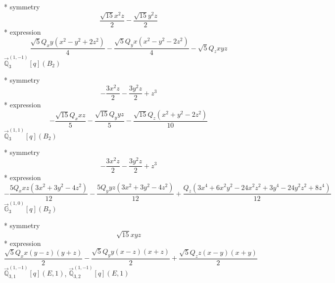 \documentclass[fleqn,8pt]{jsarticle}
\begin{document}
\noindent\quad ** symmetry
\begin{dmath*}
\frac{\sqrt{15} x^{2} z}{2} - \frac{\sqrt{15} y^{2} z}{2}
\end{dmath*}
\noindent\quad ** expression
\begin{dmath*}
\frac{\sqrt{5} Q_{x} y \left(x^{2} - y^{2} + 2 z^{2}\right)}{4} - \frac{\sqrt{5} Q_{y} x \left(x^{2} - y^{2} - 2 z^{2}\right)}{4} - \sqrt{5} Q_{z} x y z
\end{dmath*}
\noindent\quad $\vec{\mathbb{Q}}_{3}^{(1,-1)}[q](B_{2})$

\noindent\quad ** symmetry
\begin{dmath*}
- \frac{3 x^{2} z}{2} - \frac{3 y^{2} z}{2} + z^{3}
\end{dmath*}
\noindent\quad ** expression
\begin{dmath*}
- \frac{\sqrt{15} Q_{x} x z}{5} - \frac{\sqrt{15} Q_{y} y z}{5} - \frac{\sqrt{15} Q_{z} \left(x^{2} + y^{2} - 2 z^{2}\right)}{10}
\end{dmath*}
\noindent\quad $\vec{\mathbb{Q}}_{3}^{(1,1)}[q](B_{2})$

\noindent\quad ** symmetry
\begin{dmath*}
- \frac{3 x^{2} z}{2} - \frac{3 y^{2} z}{2} + z^{3}
\end{dmath*}
\noindent\quad ** expression
\begin{dmath*}
- \frac{5 Q_{x} x z \left(3 x^{2} + 3 y^{2} - 4 z^{2}\right)}{12} - \frac{5 Q_{y} y z \left(3 x^{2} + 3 y^{2} - 4 z^{2}\right)}{12} + \frac{Q_{z} \left(3 x^{4} + 6 x^{2} y^{2} - 24 x^{2} z^{2} + 3 y^{4} - 24 y^{2} z^{2} + 8 z^{4}\right)}{12}
\end{dmath*}
\noindent\quad $\vec{\mathbb{G}}_{3}^{(1,0)}[q](B_{2})$

\noindent\quad ** symmetry
\begin{dmath*}
\sqrt{15} x y z
\end{dmath*}
\noindent\quad ** expression
\begin{dmath*}
\frac{\sqrt{5} Q_{x} x \left(y - z\right) \left(y + z\right)}{2} - \frac{\sqrt{5} Q_{y} y \left(x - z\right) \left(x + z\right)}{2} + \frac{\sqrt{5} Q_{z} z \left(x - y\right) \left(x + y\right)}{2}
\end{dmath*}
\noindent\quad $\vec{\mathbb{Q}}_{3,1}^{(1,-1)}[q](E,1)$, $\vec{\mathbb{Q}}_{3,2}^{(1,-1)}[q](E,1)$
\end{document}
